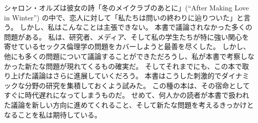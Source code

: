 \documentclass[paper=a4,book,openany]{jlreq}
\begin{document}
\vspace{1\zw}

シャロン・オルズは彼女の詩「冬のメイクラブのあとに」(``After Making Love in Winter'') の中で、恋人に対して「私たちは問いの終わりに辿りついた」と言う。
しかし、私はこんなことは主張できない。
本書で議論されなかった多くの問題がある。
私は、研究者、メディア、そして私の学生たちが特に強い関心を寄せているセックス倫理学の問題をカバーしようと最善を尽くした。
しかし、他にも多くの問題について議論することができただろうし、私が本書で考察しなかった新たな問題が現れてくるもの確実だ。
そしてそれまでにも、この本で取り上げた議論はさらに進展していくだろう。
本書はこうした刺激的でダイナミックな分野の研究を集積しておくよう試みた。
この種の本は、その宿命としてすぐに時代遅れになってしまうものだ。
せめて、何人かの読者が本書で扱われた議論を新しい方向に進めてくれること、そして新たな問題を考えるきっかけとなることを私は期待している。
\end{document}

